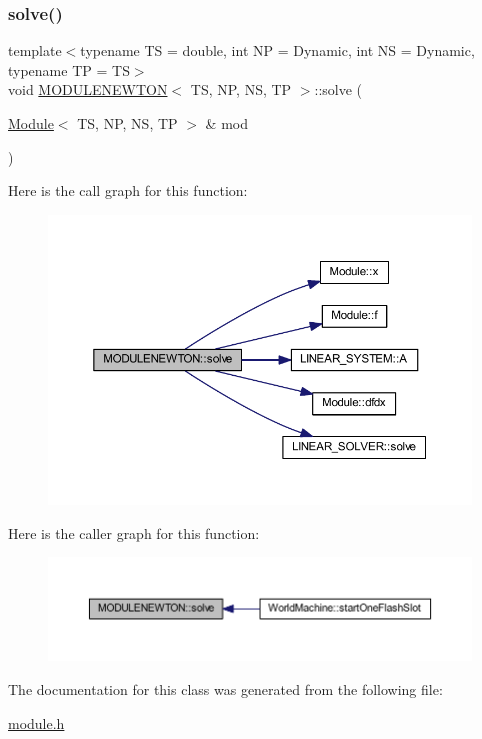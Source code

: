 \subsubsection{\texorpdfstring{solve()}{solve()}}
{\footnotesize\ttfamily template$<$typename TS = double, int NP = Dynamic, int NS = Dynamic, typename TP = TS$>$ \\
void \mbox{\hyperlink{class_m_o_d_u_l_e_n_e_w_t_o_n}{M\+O\+D\+U\+L\+E\+N\+E\+W\+T\+ON}}$<$ TS, NP, NS, TP $>$\+::solve (\begin{DoxyParamCaption}\item[{\mbox{\hyperlink{class_module}{Module}}$<$ TS, NP, NS, TP $>$ \&}]{mod }\end{DoxyParamCaption})\hspace{0.3cm}{\ttfamily [inline]}}

Here is the call graph for this function\+:\nopagebreak
\begin{figure}[H]
\begin{center}
\leavevmode
\includegraphics[width=350pt]{class_m_o_d_u_l_e_n_e_w_t_o_n_a8c3da4880abb18ae9e99854c21335e20_cgraph}
\end{center}
\end{figure}
Here is the caller graph for this function\+:\nopagebreak
\begin{figure}[H]
\begin{center}
\leavevmode
\includegraphics[width=350pt]{class_m_o_d_u_l_e_n_e_w_t_o_n_a8c3da4880abb18ae9e99854c21335e20_icgraph}
\end{center}
\end{figure}


The documentation for this class was generated from the following file\+:\begin{DoxyCompactItemize}
\item 
\mbox{\hyperlink{module_8h}{module.\+h}}\end{DoxyCompactItemize}
